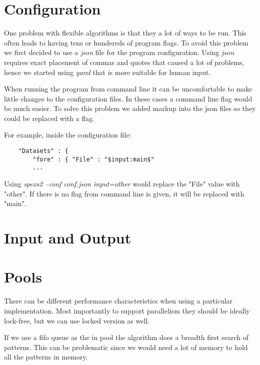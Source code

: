 \section{Configuration}

One problem with flexible algorithms is that they a lot of ways to be run.
This often leads to having tens or hundereds of program flags.
To avoid this problem we first decided to use a \emph{json} file for the program
configuration. Using \emph{json} requires exact placement of commas and quotes that
caused a lot of problems, hence we started using \emph{yaml} that is more suitable for
human input.


When running the program from command line it can be uncomfortable to
make little changes to the configuration files. In these cases a command line
flag would be much easier. To solve this problem we added markup into the 
json files so they could be replaced with a flag.

For example, inside the configuration file:

\begin{verbatim}
    "Datasets" : {
        "fore" : { "File" : "$input:main$"
        ...
\end{verbatim}

Using \emph{spexs2 --conf conf.json input=other} would replace the "File" value 
with "other". If there is no flag from command line is given, it will be replaced with "main".

\section{Input and Output}


\section{Pools}

There can be different performance characteristics when using a particular implementation. 
Most importantly to support parallelism they should be ideally lock-free,
but we can use locked version as well.

If we use a fifo queue as the in pool the algorithm does a breadth first search of patterns.
This can be problematic since we would need a lot of memory to hold all the patterns in memory.

